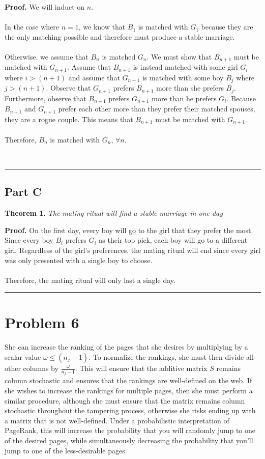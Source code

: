 \documentclass{article}%
\newtheorem{theorem}{Theorem}
\newenvironment{proof}[1][Proof]{\noindent\textbf{#1.} }{\ \rule{0.5em}{0.5em}}
\begin{document}
\begin{proof}
We will induct on $n$.\\ \\
In the case where $n=1$, we know that $B_1$ is matched with $G_1$ because they are the only matching possible and therefore must produce a stable marriage. \\ \\
Otherwise, we assume that $B_n$ is matched $G_n$. We must show that $B_{n+1}$ must be matched with $G_{n+1}$. Assume that $B_{n+1}$ is instead matched with some girl $G_i$ where $i > (n+1)$ and assume that $G_{n+1}$ is matched with some boy $B_j$ where $j > (n+1)$. Observe that $G_{n+1}$ prefers $B_{n+1}$ more than she prefers $B_j$. Furthermore, observe that $B_{n+1}$ prefers $G_{n+1}$ more than he prefers $G_i$. Because $B_{n+1}$ and $G_{n+1}$ prefer each other more than they prefer their matched spouses, they are a rogue couple. This means that $B_{n+1}$ must be matched with $G_{n+1}$.\\ \\
    Therefore, $B_n$ is matched with $G_n$, $\forall n$.

\end{proof}

\subsection{Part C}
\begin{theorem}
The mating ritual will find a stable marriage in one day
\end{theorem}

\begin{proof}
    On the first day, every boy will go to the girl that they prefer the most. Since every boy $B_i$ prefers $G_i$ as their top pick, each boy will go to a different girl. Regardless of the girl's preferences, the mating ritual will end since every girl was only presented with a single boy to choose. \\ \\
    Therefore, the mating ritual will only last a single day.
\end{proof}

\section{Problem 6}
She can increase the ranking of the pages that she desires by multiplying by a scalar value $\omega \leq (n_j - 1)$. To normalize the rankings, she must then divide all other columns by $\frac{\omega}{n_j - 1}$. This will ensure that the additive matrix $S$ remains column stochastic and ensures that the rankings are well-defined on the web. If she wishes to increase the rankings for multiple pages, then she must perform a similar procedure, although she must ensure that the matrix remains column stochastic throughout the tampering process, otherwise she risks ending up with a matrix that is not well-defined. Under a probabilistic interpretation of PageRank, this will increase the probability that you will randomly jump to one of the desired pages, while simultaneously decreasing the probability that you'll jump to one of the less-desirable pages.
\end{document}
